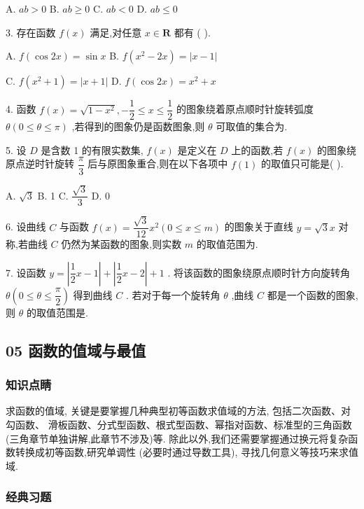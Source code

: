 A. ${ab} > 0$ B. ${ab} \geq  0$ C. ${ab} < 0$ D. ${ab} \leq  0$

3. 存在函数 $f\left( x\right)$ 满足,对任意 $x \in  \mathbf{R}$ 都有 (   ).

A. $f\left( {\cos {2x}}\right)  = \sin x$ B. $f\left( {{x}^{2} - {2x}}\right)  = \left| {x - 1}\right|$

C. $f\left( {{x}^{2} + 1}\right)  = \left| {x + 1}\right|$ D. $f\left( {\cos {2x}}\right)  = {x}^{2} + x$

4. 函数 $f\left( x\right)  = \sqrt{1 - {x}^{2}}, - \dfrac{1}{2} \leq  x \leq  \dfrac{1}{2}$ 的图象绕着原点顺时针旋转弧度 $\theta \left( {0 \leq  \theta  \leq  \pi }\right)$ ,若得到的图象仍是函数图象,则 $\theta$ 可取值的集合为\blkda{}.

5. 设 $D$ 是含数 1 的有限实数集, $f\left( x\right)$ 是定义在 $D$ 上的函数,若 $f\left( x\right)$ 的图象绕原点逆时针旋转 $\dfrac{\pi }{3}$ 后与原图象重合,则在以下各项中 $f\left( 1\right)$ 的取值只可能是(   ).

A. $\sqrt{3}$ B. 1 C. $\dfrac{\sqrt{3}}{3}$ D. 0

6. 设曲线 $C$ 与函数 $f\left( x\right)  = \dfrac{\sqrt{3}}{12}{x}^{2}\left( {0 \leq  x \leq  m}\right)$ 的图象关于直线 $y = \sqrt{3}x$ 对称,若曲线 $C$ 仍然为某函数的图象,则实数 $m$ 的取值范围为\blkda{}.

7. 设函数 $y = \left| {\dfrac{1}{2}x - 1}\right|  + \left| {\dfrac{1}{2}x - 2}\right|  + 1$ . 将该函数的图象绕原点顺时针方向旋转角 $\theta \left( {0 \leq  \theta  \leq  \dfrac{\pi }{2}}\right)$ 得到曲线 $C$ . 若对于每一个旋转角 $\theta$ ,曲线 $C$ 都是一个函数的图象,则 $\theta$ 的取值范围是\blkda{}.

\subsection*{05 函数的值域与最值}

\subsubsection*{知识点睛}

求函数的值域, 关键是要掌握几种典型初等函数求值域的方法, 包括二次函数、对勾函数、 滑板函数、分式型函数、根式型函数、幂指对函数、标准型的三角函数(三角章节单独讲解,此章节不涉及)等. 除此以外,我们还需要掌握通过换元将复杂函数转换成初等函数,研究单调性 (必要时通过导数工具), 寻找几何意义等技巧来求值域.

\subsubsection*{经典习题}

